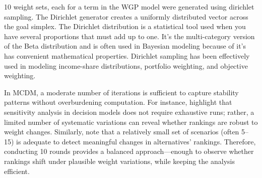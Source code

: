 10 weight sets, each for a term in the WGP model were generated using dirichlet sampling\cite{Neal2000}. The Dirichlet generator creates a uniformly distributed vector across the goal simplex. The Dirichlet distribution is a statistical tool used when you have several proportions that must add up to one. It’s the multi-category version of the Beta distribution and is often used in Bayesian modeling because of it's has convenient mathematical properties\cite{Lin2016}. Dirichlet sampling has been effectively used in modeling income-share distributions, portfolio weighting, and objective weighting\cite{khoi2025,Duangkamon2002,Williams2024}.

In MCDM, a moderate number of iterations is sufficient to capture stability patterns without overburdening computation. For instance, \cite{Triantaphyllou1997} highlight that sensitivity analysis in decision models does not require exhaustive runs; rather, a limited number of systematic variations can reveal whether rankings are robust to weight changes. Similarly, \cite{Belton2002} note that a relatively small set of scenarios (often 5–15) is adequate to detect meaningful changes in alternatives’ rankings. Therefore, conducting 10 rounds provides a balanced approach—enough to observe whether rankings shift under plausible weight variations, while keeping the analysis efficient.





















